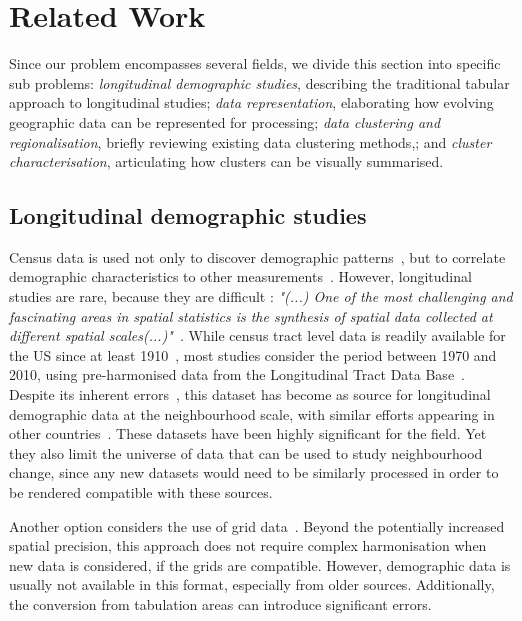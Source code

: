 \section{Related Work}
\label{sec:related}

Since our problem encompasses several fields, we divide this section into
specific sub problems: \emph{longitudinal demographic studies}, describing the
traditional tabular approach to longitudinal studies; \emph{data
representation}, elaborating how evolving geographic data can be represented for
processing; \emph{data clustering and regionalisation}, briefly reviewing
existing data clustering methods,; and \emph{cluster characterisation}, articulating how clusters
can be visually summarised.

\subsection{Longitudinal demographic studies}
Census data is used not only to discover demographic
patterns~\citep{Firebaugh2016}, but to correlate demographic characteristics to
other measurements~\citep{diez1997neighborhood}. However, longitudinal studies
are rare, because they are difficult : \emph{"(...) One of the most challenging
and fascinating areas in spatial statistics is the synthesis of spatial data
collected at different spatial scales(...)"}~\citep{gotway2002combining}. While
census tract level data is readily available for the US since at least
1910~\citep{nhgis}, most studies consider the period between 1970 and 2010,
using pre-harmonised data from the Longitudinal Tract Data
Base~\citep{Logan2014}. Despite its inherent
errors~\citep{Logan2016,Hallisey2017}, this dataset has become  as source for
longitudinal demographic data at the neighbourhood scale, with similar efforts
appearing in other countries~\citep{Liu2015,Lee2015,Allen2018}. These datasets
have been highly significant for the field. Yet they also limit the universe of
data that can be used to study neighbourhood change, since any new datasets
would need to be similarly processed in order to be rendered compatible with
these sources. 

Another option considers the use of grid
data~\citep{Dmowska2017,Dmowska2018,stepinski2019imperfect}. Beyond the
potentially increased spatial precision, this approach does not require complex
harmonisation when new data is considered, if the grids are compatible. However,
demographic data is usually not available in this format, especially from older
sources. Additionally, the conversion from tabulation areas can introduce
significant errors.

